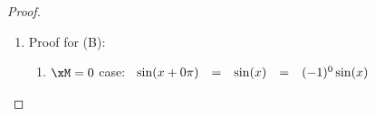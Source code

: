 \begin{proof}
\begin{enumerate}
\begin{enumerate}
      \item Proof for $\xM<0$ cases: Let $\xN\eqd-\xM$ \ldots $\implies \xN>0$.
        \begin{align*}
          \cos\brp{x+\xM\pi}
            &\eqd \cos\brp{x-\xN\pi}
            && \text{by definition of $\xN$}
          \\&= \cos(x)\cos(-\xN\pi)-\sin(x)\sin(-\xN\pi)
            && \text{by \thme{double angle formulas}}&&\text{\xref{thm:trig_double}}
          \\&= \cos(x)\cos(\xN\pi)+\sin(x)\sin(\xN\pi)
            && \text{by \prefp{thm:cos-x}}
          \\&= \cos(x)\cos(0+\xN\pi)+\sin(x)\sin(0+\xN\pi)
          \\&= \cos(x)(-1)^\xN\cos(0)+\sin(x)(-1)^\xN\sin(0)
            && \text{by $\xM\ge0$ results}&&\text{\xref{item:cosxMpiA_gt0}}
          \\&= (-1)^\xN\cos(x)
            && \text{by $\scy\cos(0)=1$, $\scy\sin(0)=0$ results}&&\text{\xref{thm:sin0}}
          \\&\eqd (-1)^{-\xM}\cos(x)
            && \text{by definition of $\xN$}
          \\&= (-1)^{\xM}\cos(x)
        \end{align*}

      \item Proof using complex exponential:
        \begin{align*}
          \cos\brp{ x+\xM\pi}
            &= \frac{e^{i\brp{ x+\xM\pi}} + e^{ -i\brp{ x+\xM\pi} }}{2}
            && \text{by \thme{Euler formulas}}
            && \text{\xref{cor:trig_ceesee}}
          \\&= e^{i\xM\pi} \brs{\frac{e^{ix} + e^{ -ix}}{2}}
            && \text{by $e^{\alpha\beta}=e^\alpha e^\beta$ result}&&\text{\xref{thm:trig_eab}}
          \\&= \brp{e^{i\pi}}^\xM \cos x
            && \text{by \thme{Euler formulas}}
            && \text{\xref{cor:trig_ceesee}}
          \\&= (-1)^\xM \cos x
            && \text{by $e^{i\pi}=-1$ result}&&\text{\xref{prop:expipi}}
        \end{align*}
    \end{enumerate}

  \item Proof for (B):
    \begin{enumerate}
      \item $\xM=0$ case:
        $\begin{array}[t]{rclcl}
          \sin(x+0\pi) &=& \sin(x) &=& (-1)^0\sin(x)
        \end{array}$


\end{enumerate}
\end{enumerate}
\end{proof}
